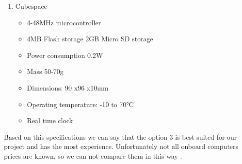 \begin{enumerate}
\begin{itemize}
	\end{itemize}
	\item Cubespace
	\begin{itemize}
		\item 4-48MHz microcontroller
		\item 4MB Flash storage 2GB Micro SD storage
		\item Power consumption 0.2W
		\item Mass 50-70g
		\item Dimensions: 90 x96 x10mm
		\item Operating temperature: -10 to 70°C
		\item Real time clock
	\end{itemize}
\end{enumerate}

Based on this specifications we can say that the option 3 is best suited for our
project and has the most experience. Unfortunately not all onboard
computers prices are known, so we can not compare them in this way \cite{SMAD}.
